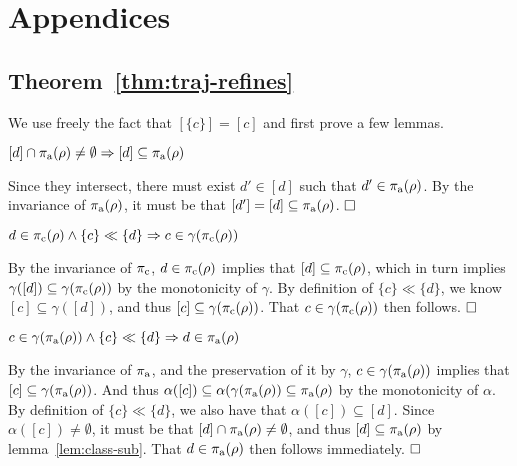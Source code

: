 \section{Appendices}

\subsection{Theorem~\ref{thm:traj-refines}}

We use freely the fact that $[\{ c \}] = [c]$ and first prove a few lemmas.

\begin{lemma} \label{lem:class-sub}
$[d] \cap \operatorname{\pi_{\textrm{a}}}(\rho) \neq \emptyset \Rightarrow [d] \subseteq \operatorname{\pi_{\textrm{a}}}(\rho)$
\end{lemma}

Since they intersect, there must exist $d' \in [d]$ such that $d' \in \operatorname{\pi_{\textrm{a}}}(\rho)$. By the invariance of $\operatorname{\pi_{\textrm{a}}}(\rho)$, it must be that $[d'] = [d] \subseteq \operatorname{\pi_{\textrm{a}}}(\rho)$. $\qedbox$

\begin{lemma} \label{lem:traj-con}
$d \in \operatorname{\pi_{\textrm{c}}}(\rho) \wedge \{ c \} \ll \{ d \} \Rightarrow c \in \gamma(\operatorname{\pi_{\textrm{c}}}(\rho))$
\end{lemma}

By the invariance of $\operatorname{\pi_{\textrm{c}}}$, $d \in \operatorname{\pi_{\textrm{c}}}(\rho)$ implies that $[d] \subseteq \operatorname{\pi_{\textrm{c}}}(\rho)$, which in turn implies $\gamma([d]) \subseteq \gamma(\operatorname{\pi_{\textrm{c}}}(\rho))$ by the monotonicity of $\gamma$. By definition of $\{ c \} \ll \{ d \}$, we know $[c] \subseteq \gamma([d])$, and thus $[c] \subseteq \gamma(\operatorname{\pi_{\textrm{c}}}(\rho))$. That $c \in \gamma(\operatorname{\pi_{\textrm{c}}}(\rho))$ then follows. $\qedbox$

\begin{lemma} \label{lem:traj-ant}
$c \in \gamma(\operatorname{\pi_{\textrm{a}}}(\rho)) \wedge \{ c \} \ll \{ d \} \Rightarrow d \in \operatorname{\pi_{\textrm{a}}}(\rho)$
\end{lemma}

By the invariance of $\operatorname{\pi_{\textrm{a}}}$, and the preservation of it by $\gamma$, $c \in \gamma(\operatorname{\pi_{\textrm{a}}}(\rho))$ implies that $[c] \subseteq \gamma(\operatorname{\pi_{\textrm{a}}}(\rho))$. And thus $\alpha([c]) \subseteq \alpha(\gamma(\operatorname{\pi_{\textrm{a}}}(\rho)) \subseteq \operatorname{\pi_{\textrm{a}}}(\rho)$ by the monotonicity of $\alpha$. By definition of $\{ c \} \ll \{ d \}$, we also have that $\alpha([c]) \subseteq [d]$. Since $\alpha([c]) \neq \emptyset$, it must be that $[d] \cap \operatorname{\pi_{\textrm{a}}}(\rho) \neq \emptyset$, and thus $[d] \subseteq \operatorname{\pi_{\textrm{a}}}(\rho)$ by lemma~\ref{lem:class-sub}. That $d \in \operatorname{\pi_{\textrm{a}}}(\rho)$ then follows immediately. $\qedbox$
\\

